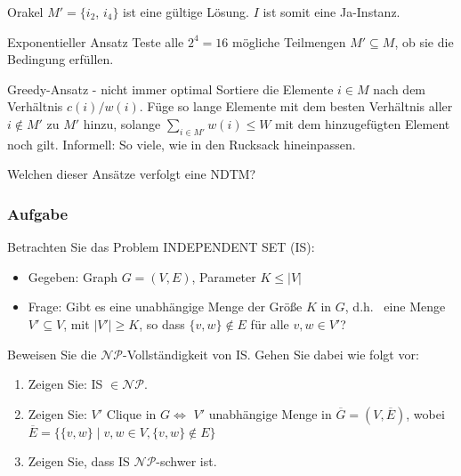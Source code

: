 \documentclass{beamer}
\begin{document}
\begin{frame}
\begin{block}{Orakel}
  $M' = \{i_2$, $i_4\}$ ist eine gültige Lösung. $I$ ist somit eine Ja-Instanz.
 \end{block}
\begin{block}{Exponentieller Ansatz}
 Teste alle $2^4 = 16$ mögliche Teilmengen $M' \subseteq M$, ob sie die Bedingung erfüllen. 
\end{block}
\begin{block}{Greedy-Ansatz - nicht immer optimal}
 Sortiere die Elemente $i \in M$ nach dem Verhältnis $c(i)/w(i)$. 
 Füge so lange Elemente mit dem besten Verhältnis aller $i \not\in M'$ zu $M'$ hinzu, solange $\sum_{i \in M'} w(i) \leq W$ mit dem hinzugefügten Element noch gilt.
 Informell: So viele, wie in den Rucksack hineinpassen.
\end{block}
\pause
\begin{block}{}
 Welchen dieser Ansätze verfolgt eine NDTM?
\end{block}

\end{frame}


\begin{frame}
\frametitle{Aufgabe}
Betrachten Sie das Problem INDEPENDENT SET (IS):

\begin{itemize}
 \item Gegeben: Graph $G=(V, E)$, Parameter $K \leq |V|$
 \item Frage: Gibt es eine unabhängige Menge der Größe $K$ in $G$, d.h.~ eine Menge $V' \subseteq V$, mit $|V'| \geq K$, so dass $\{v, w\} \notin E$ für alle $v, w \in V'$? 
\end{itemize}
Beweisen Sie die $\mathcal{NP}$-Vollständigkeit von IS. Gehen Sie dabei wie folgt vor:
\begin{enumerate}
 \item Zeigen Sie: IS $\in \mathcal{NP}$.
 \item Zeigen Sie: $V'$ Clique in $G \Longleftrightarrow$ $V'$ unabhängige Menge in $\overline{G}=(V, \overline{E})$, wobei \\
$\overline{E}= \{\{v, w\} \mid v, w \in V, \{v, w\} \notin E\}$
 \item Zeigen Sie, dass IS $\mathcal{NP}$-schwer ist.
\end{enumerate}
\end{frame}
\end{document}
